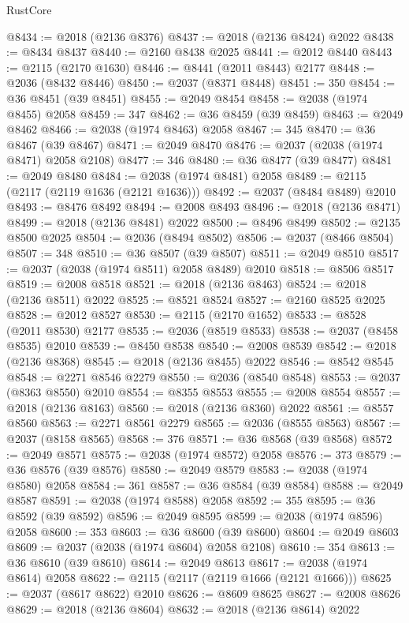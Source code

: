 \begin{lexlean}{RustCore}
\begin{coremodule}
@8434 := @2018 (@2136 @8376)
@8437 := @2018 (@2136 @8424) @2022
@8438 := @8434 @8437
@8440 := @2160 @8438 @2025
@8441 := @2012 @8440
@8443 := @2115 (@2170 @1630)
@8446 := @8441 (@2011 @8443) @2177
@8448 := @2036 (@8432 @8446)
@8450 := @2037 (@8371 @8448)
@8451 := 350
@8454 := @36 @8451 (@39 @8451)
@8455 := @2049 @8454
@8458 := @2038 (@1974 @8455) @2058
@8459 := 347
@8462 := @36 @8459 (@39 @8459)
@8463 := @2049 @8462
@8466 := @2038 (@1974 @8463) @2058
@8467 := 345
@8470 := @36 @8467 (@39 @8467)
@8471 := @2049 @8470
@8476 := @2037 (@2038 (@1974 @8471) @2058 @2108)
@8477 := 346
@8480 := @36 @8477 (@39 @8477)
@8481 := @2049 @8480
@8484 := @2038 (@1974 @8481) @2058
@8489 := @2115 (@2117 (@2119 @1636 (@2121 @1636)))
@8492 := @2037 (@8484 @8489) @2010
@8493 := @8476 @8492
@8494 := @2008 @8493
@8496 := @2018 (@2136 @8471)
@8499 := @2018 (@2136 @8481) @2022
@8500 := @8496 @8499
@8502 := @2135 @8500 @2025
@8504 := @2036 (@8494 @8502)
@8506 := @2037 (@8466 @8504)
@8507 := 348
@8510 := @36 @8507 (@39 @8507)
@8511 := @2049 @8510
@8517 := @2037 (@2038 (@1974 @8511) @2058 @8489) @2010
@8518 := @8506 @8517
@8519 := @2008 @8518
@8521 := @2018 (@2136 @8463)
@8524 := @2018 (@2136 @8511) @2022
@8525 := @8521 @8524
@8527 := @2160 @8525 @2025
@8528 := @2012 @8527
@8530 := @2115 (@2170 @1652)
@8533 := @8528 (@2011 @8530) @2177
@8535 := @2036 (@8519 @8533)
@8538 := @2037 (@8458 @8535) @2010
@8539 := @8450 @8538
@8540 := @2008 @8539
@8542 := @2018 (@2136 @8368)
@8545 := @2018 (@2136 @8455) @2022
@8546 := @8542 @8545
@8548 := @2271 @8546 @2279
@8550 := @2036 (@8540 @8548)
@8553 := @2037 (@8363 @8550) @2010
@8554 := @8355 @8553
@8555 := @2008 @8554
@8557 := @2018 (@2136 @8163)
@8560 := @2018 (@2136 @8360) @2022
@8561 := @8557 @8560
@8563 := @2271 @8561 @2279
@8565 := @2036 (@8555 @8563)
@8567 := @2037 (@8158 @8565)
@8568 := 376
@8571 := @36 @8568 (@39 @8568)
@8572 := @2049 @8571
@8575 := @2038 (@1974 @8572) @2058
@8576 := 373
@8579 := @36 @8576 (@39 @8576)
@8580 := @2049 @8579
@8583 := @2038 (@1974 @8580) @2058
@8584 := 361
@8587 := @36 @8584 (@39 @8584)
@8588 := @2049 @8587
@8591 := @2038 (@1974 @8588) @2058
@8592 := 355
@8595 := @36 @8592 (@39 @8592)
@8596 := @2049 @8595
@8599 := @2038 (@1974 @8596) @2058
@8600 := 353
@8603 := @36 @8600 (@39 @8600)
@8604 := @2049 @8603
@8609 := @2037 (@2038 (@1974 @8604) @2058 @2108)
@8610 := 354
@8613 := @36 @8610 (@39 @8610)
@8614 := @2049 @8613
@8617 := @2038 (@1974 @8614) @2058
@8622 := @2115 (@2117 (@2119 @1666 (@2121 @1666)))
@8625 := @2037 (@8617 @8622) @2010
@8626 := @8609 @8625
@8627 := @2008 @8626
@8629 := @2018 (@2136 @8604)
@8632 := @2018 (@2136 @8614) @2022

\end{coremodule}
\end{lexlean}
